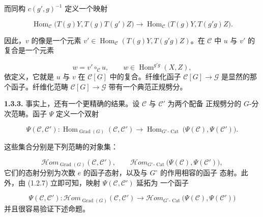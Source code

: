 \clearpage
{}%
而同构 $c(g',g)^{-1}$ 定义一个映射

\begin{equation}
  \operatorname{Hom}_{\mathcal C}
    \bigl(T(g)Y,T(g)T(g')Z\bigr)
  \longrightarrow
  \operatorname{Hom}_{\mathcal C}
    \bigl(T(g)Y,T(g'g)Z\bigr).
  \tag{1.3.2.4}
\end{equation}

因此，$v$ 的像是一个元素
$v'\in\operatorname{Hom}_{\mathcal C}(T(g)Y,T(g'g)Z)$。在 $\mathcal C$ 中
$u$ 与 $v'$ 的复合是一个元素

\begin{equation}
  w=v'\mathbin{\circ_{\mathcal C}}u,
  \qquad w\in\operatorname{Hom}^{g'g}(X,Z),
  \tag{1.3.2.5}
\end{equation}
依定义，它就是 $u$ 与 $v$ 在 $\mathcal C[G]$ 中的复合。纤维化函子
$\mathcal C[G]\to\mathcal G$ 是显然的那个函子。纤维化范畴
$\mathcal C[G]\to\mathcal G$ 带有一个典范正规劈分。

\noindent\textbf{1.3.3.}\quad
事实上，还有一个更精确的结果。设 $\mathcal C$ 与 $\mathcal C'$ 为两个配备
正规劈分的 $G$-分次范畴。函子 $\Psi$ 定义一个双射

\begin{equation}
  \Psi(\mathcal C,\mathcal C')\colon
  \operatorname{Hom}_{\operatorname{Grad}(G)}(\mathcal C,\mathcal C')
  \longrightarrow
  \operatorname{Hom}_{G^\circ\text{-}\operatorname{Cat}}
    \bigl(\Psi(\mathcal C),\Psi(\mathcal C')\bigr).
  \tag{1.3.3.1}
\end{equation}

这些集合分别是下列范畴的对象集：

\begin{equation}
  \mathcal{H}\!om_{\operatorname{Grad}(G)}(\mathcal C,\mathcal C'),
  \qquad
  \mathcal{H}\!om_{G^\circ\text{-}\operatorname{Cat}}
    \bigl(\Psi(\mathcal C),\Psi(\mathcal C')\bigr),
  \tag{1.3.3.2}
\end{equation}
它们的态射分别为次数 $e$ 的函子态射，以及与 $G^\circ$ 的作用相容的函子
态射。此外，由 (1.2.7) 立即可知，映射 $\Psi(\mathcal C,\mathcal C')$ 延拓为
一个函子

\begin{equation}
  \Psi(\mathcal C,\mathcal C')\colon
  \mathcal{H}\!om_{\operatorname{Grad}(G)}(\mathcal C,\mathcal C')
  \longrightarrow
  \mathcal{H}\!om_{G^\circ\text{-}\operatorname{Cat}}
    \bigl(\Psi(\mathcal C),\Psi(\mathcal C')\bigr)
  \tag{1.3.3.3}
\end{equation}
并且很容易验证下述命题。

